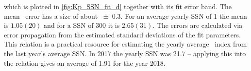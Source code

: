 which is plotted in \autoref{fig:Kp_SSN_fit_d} together with its fit error band. The mean \Kp~error has a size of about \num{+-0.3}. For an average yearly SSN of 1 the mean \Kp{} is $1.05(20)$ and for a SSN of 300 it is $2.65(31)$. The errors are calculated via error propagation from the estimated standard deviations of the fit parameters.
This relation is a practical resource for estimating the yearly average \Kp~index from the last year's average SSN. In 2017 the yearly SSN was \num{21.7} -- applying this into the relation gives an average \Kp{} of \num{1.91} for the year 2018.

\pagebreak

